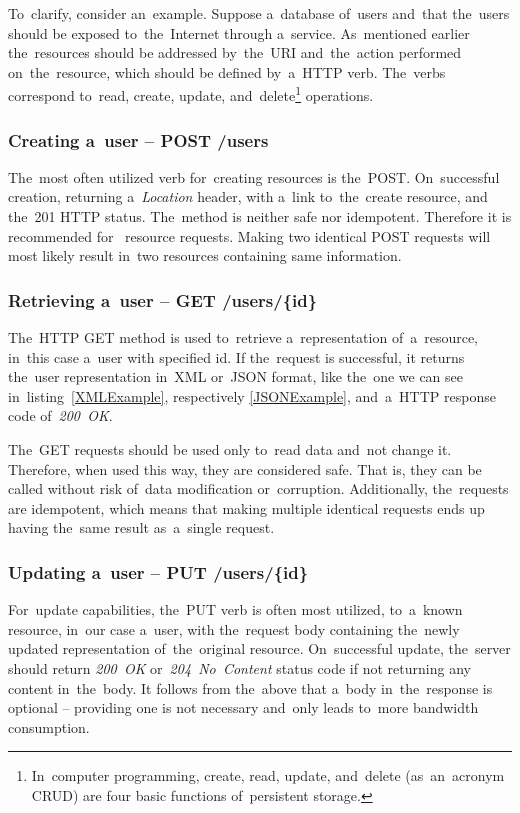 To~clarify, consider an~example. Suppose a~database of~users and~that the~users
should be exposed to~the~Internet through a~service. As~mentioned earlier
the~resources should be addressed by~the~URI and~the~action performed
on~the~resource, which should be defined by~a~HTTP verb. The~verbs correspond
to~read, create, update, and~delete\footnote{In~computer programming, create,
read, update, and~delete (as~an~acronym CRUD) are four basic functions
of~persistent storage.} operations.


\subsubsection{Creating a~user -- POST /users}
The~most often utilized verb for~creating resources is the~POST. On~successful
creation, returning a~\textit{Location} header, with a~link to~the~create
resource, and the~201 HTTP status. The~method is neither safe nor idempotent.
Therefore it is recommended for~ resource requests. Making
two identical POST requests will most likely result in~two resources containing
same information.


\subsubsection{Retrieving a~user -- GET /users/\{id\}}
The~HTTP GET method is used to~retrieve a~representation of~a~resource, in~this
case a~user with specified id. If the~request is successful, it returns the~user
representation in~XML or~JSON format, like the~one we can see
in~listing~\ref{XMLExample}, respectively \ref{JSONExample},
and~a~HTTP response code of~\textit{200~OK}.

The~GET requests should be used only to~read data and~not change it. Therefore,
when used this way, they are considered safe. That is, they can be called
without risk of~data modification or~corruption. Additionally, the~requests are
idempotent, which means that making multiple identical requests ends up having
the~same result as~a~single request.

\subsubsection{Updating a~user -- PUT /users/\{id\}}
For~update capabilities, the~PUT verb is often most utilized, 
to~a~known resource, in~our case a~user, with the~request body containing
the~newly updated representation of~the~original resource. On~successful update,
the~server should return \textit{200~OK} or~\textit{204~No~Content} status code
if not returning any content in~the~body. It follows from the~above that a~body in~the~response
is optional -- providing one is not necessary and~only leads to~more
bandwidth consumption.

